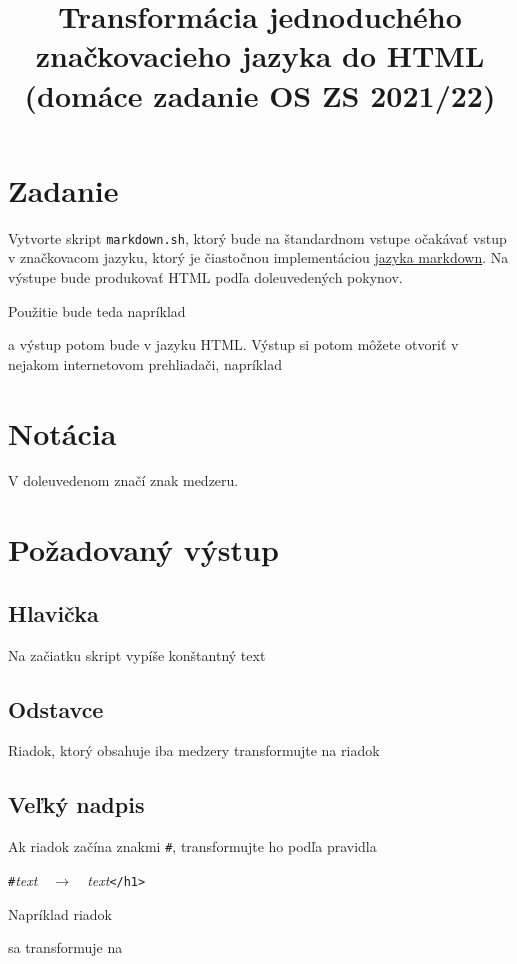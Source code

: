\documentclass{article}
\newcommand{\codefile}[1]{\begin{framed}\end{framed}}
\begin{document}
\title{Transformácia jednoduchého značkovacieho jazyka do HTML\\
(domáce zadanie OS ZS 2021/22)}
\maketitle

\section{Zadanie}
Vytvorte skript {\tt markdown.sh}, ktorý bude na štandardnom vstupe
očakávať vstup v značkovacom jazyku, ktorý je čiastočnou implementáciou
\href{https://www.markdownguide.org/}{jazyka markdown}. Na výstupe bude produkovať
HTML podľa doleuvedených pokynov.

Použitie bude teda napríklad
\begin{framed}

\end{framed}
a výstup potom bude v jazyku HTML. Výstup si potom môžete otvoriť v nejakom internetovom
prehliadači, napríklad
\begin{framed}

\end{framed}
\section{Notácia}
V doleuvedenom značí znak {\textvisiblespace} medzeru.
\section{Požadovaný výstup}
\subsection{Hlavička}
Na začiatku skript vypíše konštantný text
\begin{framed}
\small

\end{framed}
\subsection{Odstavce}
Riadok, ktorý obsahuje iba medzery transformujte na riadok
\codefile{p.html}
\subsection{Veľký nadpis}
Ak riadok začína znakmi {\tt \#\textvisiblespace}, transformujte ho podľa
pravidla
\begin{center}
{\tt \#\textvisiblespace}{\em text}$\quad\to\quad${\tt <h1>}{\em text}{\tt </h1>}
\end{center}
Napríklad riadok
\codefile{h1.md}
sa transformuje na
\codefile{h1.html}
\end{document}
